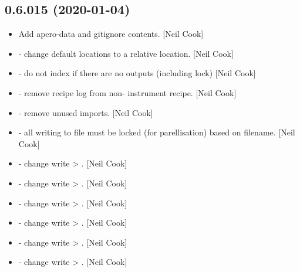 \documentclass[a4paper,10pt,english]{report}
\begin{document}
\subsection{0.6.015 (2020-01-04)}
\label{\detokenize{misc/changelog:id3}}\begin{itemize}
\item {} 
Add apero-data and gitignore contents. {[}Neil Cook{]}

\item {} 
 - change default locations
to a relative location. {[}Neil Cook{]}

\item {} 
 - do not index if there are no outputs
(including lock) {[}Neil Cook{]}

\item {} 
 - remove recipe log from non-
instrument recipe. {[}Neil Cook{]}

\item {} 
 - remove unused imports. {[}Neil Cook{]}

\item {} 
 - all writing to file must be locked (for
parellisation) based on filename. {[}Neil Cook{]}

\item {} 
 - change write \textendash{}\textgreater{} . {[}Neil Cook{]}

\item {} 
 - change write \textendash{}\textgreater{} . {[}Neil Cook{]}

\item {} 
 - change write \textendash{}\textgreater{} . {[}Neil Cook{]}

\item {} 
 - change write \textendash{}\textgreater{} . {[}Neil Cook{]}

\item {} 
 - change write \textendash{}\textgreater{} . {[}Neil Cook{]}

\item {} 
 - change write \textendash{}\textgreater{} . {[}Neil
Cook{]}


\end{itemize}
\end{document}
